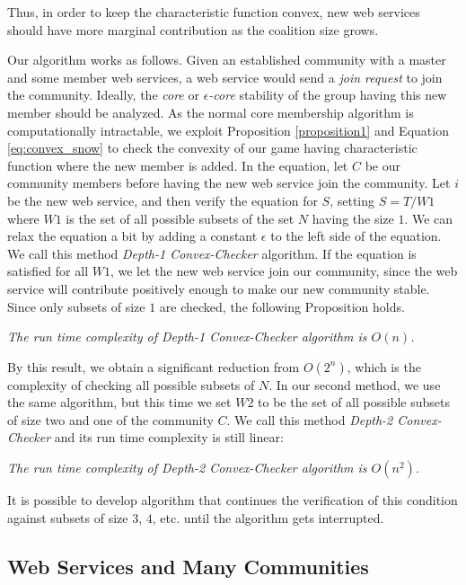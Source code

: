 \documentclass[10pt,journal,cspaper,compsoc]{IEEEtran}
\begin{document}
Thus, in order to keep the characteristic function convex, new web
services should have more marginal contribution as the coalition
size grows.

Our algorithm works as follows. Given an  established community
with a master and some member web services, a web service would send a \emph{join request} to join  the
community. Ideally, the \emph{core}
or \emph{$\epsilon$-core} stability of the group having this new
member should be analyzed. As the normal core membership algorithm is computationally
intractable, we exploit Proposition \ref{proposition1} and Equation
\ref{eq:convex_snow} to check the convexity of our game having
characteristic function where the new member is added. In the
equation, let $C$  be our community members before
having the new web service join the community. Let  ${i}$ be the new web
service, and then verify the equation for $S$, setting $ S = T /
W1 $ where $W1$ is the set of all possible subsets of the set $N$
having the size $1$. We can relax the equation a bit by adding a
constant $\epsilon$ to the left side of the equation. We call this
method \emph{Depth-1 Convex-Checker} algorithm. If the equation is
satisfied for all $W1$, we let the new web service join our
community, since the web service will contribute positively enough
to make our new community stable. Since only subsets of size $1$
are checked, the following Proposition holds.

\begin{theorem}\label{complexity1}
\emph{The run time complexity of Depth-1 Convex-Checker algorithm is
$O(n)$.}
\end{theorem}

By this result, we obtain a significant reduction from $O(2^n)$,
which is the complexity of checking all possible subsets of $N$.
In our second method, we use the same algorithm, but this time we
set $W2$ to be the set of all possible subsets of size two and one
of the community $C$. We call this method \emph{Depth-2
Convex-Checker} and its run time complexity is still
linear:

\begin{theorem}\label{complexity2}
\emph{The run time complexity of Depth-2 Convex-Checker algorithm is
$O(n^2)$.}
\end{theorem}

It is possible to develop  algorithm that continues the
verification of this condition against subsets of size $3$,
$4$, etc. until the algorithm gets interrupted.

\subsection {Web Services and Many Communities}
\end{document}
